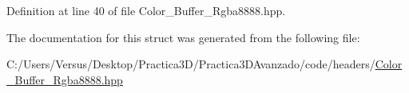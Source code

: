 Definition at line 40 of file Color\+\_\+\+Buffer\+\_\+\+Rgba8888.\+hpp.



The documentation for this struct was generated from the following file\+:\begin{DoxyCompactItemize}
\item 
C\+:/\+Users/\+Versus/\+Desktop/\+Practica3\+D/\+Practica3\+D\+Avanzado/code/headers/\mbox{\hyperlink{_color___buffer___rgba8888_8hpp}{Color\+\_\+\+Buffer\+\_\+\+Rgba8888.\+hpp}}\end{DoxyCompactItemize}
